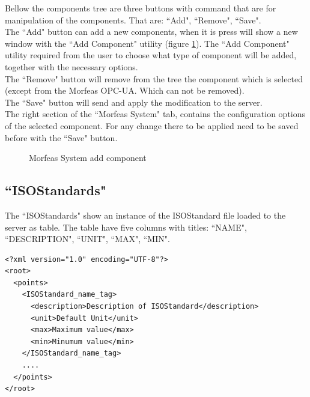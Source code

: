 Bellow the components tree are three buttons with command that are for manipulation of the components.
That are: ``Add", ``Remove", ``Save".\\

\noindent The ``Add" button can add a new components, when it is press will show a new window with the ``Add Component" utility
(figure \ref{fig:Morfeas_sys_conf_add_comp}).
The ``Add Component" utility required from the user to choose what type of component will be added, together with the necessary options.\\

\noindent The ``Remove" button will remove from the tree the component which is selected (except from the Morfeas OPC-UA. Which can not be removed).\\

\noindent The ``Save" button will send and apply the modification to the server.\\

The right section of the ``Morfeas System" tab, contains the configuration options of the selected component.
For any change there to be applied need to be saved before with the ``Save" button.

\begin{figure}[h]
\centering
	\caption{Morfeas System add component}
	\label{fig:Morfeas_sys_conf_add_comp}
\end{figure}

\newpage
\subsection{``ISOStandards"}
The ``ISOStandards" show an instance of the ISOStandard file loaded to the server as table.
The table have five columns with titles: ``NAME", ``DESCRIPTION", ``UNIT", ``MAX", ``MIN".
 
\begin{lstlisting}[frame=single,caption=Structure of ISOstandard file,label=lst:ISOStandard]
<?xml version="1.0" encoding="UTF-8"?>
<root>
  <points>
    <ISOStandard_name_tag>
      <description>Description of ISOStandard</description>
      <unit>Default Unit</unit>
      <max>Maximum value</max>
      <min>Minumum value</min>
    </ISOStandard_name_tag>
    ....
  </points>
</root>
\end{lstlisting}


